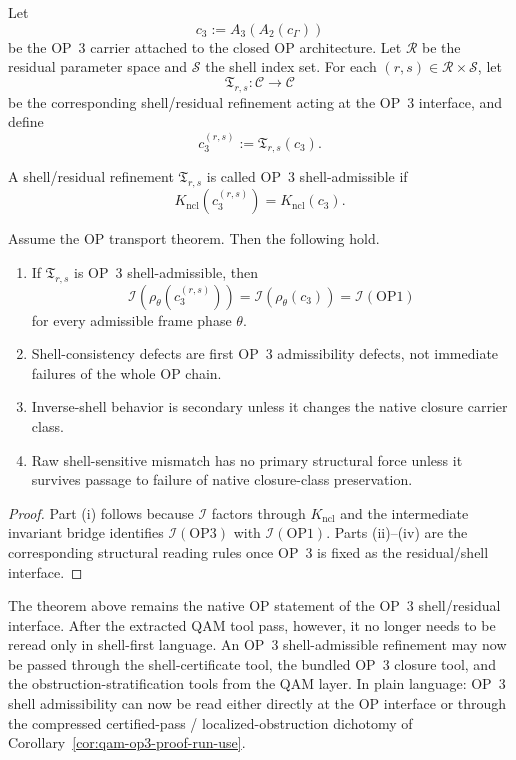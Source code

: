 Let
\[
c_{3}:=A_{3}(A_{2}(c_{\Gamma}))
\]
be the OP~3 carrier attached to the closed OP architecture. Let $\mathcal{R}$ be the residual parameter space and $\mathcal{S}$ the shell index set. For each $(r,s)\in\mathcal{R}\times\mathcal{S}$, let
\[
\mathfrak{T}_{r,s}:\mathcal{C}\to\mathcal{C}
\]
be the corresponding shell/residual refinement acting at the OP~3 interface, and define
\[
c_{3}^{(r,s)}:=\mathfrak{T}_{r,s}(c_{3}).
\]

\begin{definition}
A shell/residual refinement $\mathfrak{T}_{r,s}$ is called OP~3 shell-admissible if
\[
K_{\mathrm{ncl}}(c_{3}^{(r,s)})=K_{\mathrm{ncl}}(c_{3}).
\]
\end{definition}

\begin{theorem}
\label{thm:op3-shell}
Assume the OP transport theorem. Then the following hold.
\begin{enumerate}[leftmargin=2em,label=(\roman*)]
\item If $\mathfrak{T}_{r,s}$ is OP~3 shell-admissible, then
\[
\mathcal{I}(\rho_{\theta}(c_{3}^{(r,s)}))=\mathcal{I}(\rho_{\theta}(c_{3}))=\mathcal{I}(\mathrm{OP1})
\]
for every admissible frame phase $\theta$.
\item Shell-consistency defects are first OP~3 admissibility defects, not immediate failures of the whole OP chain.
\item Inverse-shell behavior is secondary unless it changes the native closure carrier class.
\item Raw shell-sensitive mismatch has no primary structural force unless it survives passage to failure of native closure-class preservation.
\end{enumerate}
\end{theorem}

\begin{proof}
Part (i) follows because $\mathcal{I}$ factors through $K_{\mathrm{ncl}}$ and the intermediate invariant bridge identifies $\mathcal{I}(\mathrm{OP3})$ with $\mathcal{I}(\mathrm{OP1})$. Parts (ii)--(iv) are the corresponding structural reading rules once OP~3 is fixed as the residual/shell interface.
\end{proof}

\begin{remark}
The theorem above remains the native OP statement of the OP~3 shell/residual interface. After the extracted QAM tool pass, however, it no longer needs to be reread only in shell-first language. An OP~3 shell-admissible refinement may now be passed through the shell-certificate tool, the bundled OP~3 closure tool, and the obstruction-stratification tools from the QAM layer. In plain language: OP~3 shell admissibility can now be read either directly at the OP interface or through the compressed certified-pass / localized-obstruction dichotomy of Corollary~\ref{cor:qam-op3-proof-run-use}.
\end{remark}

